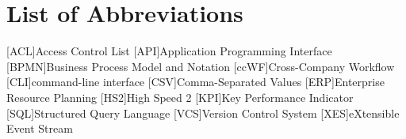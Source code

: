 \chapter*{List of Abbreviations}

\begin{acronym}[BPMN] %

	[ACL]{Access Control List}
	[API]{Application Programming Interface}
	[BPMN]{Business Process Model and Notation}
	[ccWF]{Cross-Company Workflow}
	[CLI]{command-line interface}
	[CSV]{Comma-Separated Values}
	[ERP]{Enterprise Resource Planning}
	[HS2]{High Speed 2}
	[KPI]{Key Performance Indicator}
	[SQL]{Structured Query Language}
	[VCS]{Version Control System}
	[XES]{eXtensible Event Stream}

\end{acronym}